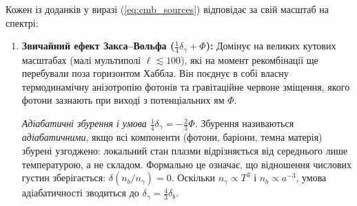 \documentclass[12pt, a4paper]{article}
\begin{document}
Кожен із доданків у виразі (\ref{eq:cmb_sources}) відповідає за свій масштаб на спектрі:
\begin{enumerate}
  \item \textbf{Звичайний ефект Закса--Вольфа ($\frac{1}{4}\delta_\gamma + \Phi$):}
        Домінує на великих кутових масштабах (малі мультиполі $\ell \lesssim 100$),
        які на момент рекомбінації ще перебували поза горизонтом Хаббла.
        Він поєднує в собі власну термодинамічну анізотропію фотонів та
        гравітаційне червоне зміщення, якого фотони зазнають при виході
        з потенціальних ям $\Phi$.

        \textit{Адіабатичні збурення і умова $\frac{1}{4}\delta_\gamma = -\frac{2}{3}\Phi$.}
        Збурення називаються \emph{адіабатичними}, якщо всі компоненти
        (фотони, баріони, темна матерія) збурені узгоджено: локальний
        стан плазми відрізняється від середнього лише температурою, а
        не складом. Формально це означає, що відношення числових густин
        зберігається: $\delta(n_b/n_\gamma) = 0$. Оскільки
        $n_\gamma \propto T^3$ і $n_b \propto a^{-3}$, умова адіабатичності
        зводиться до $\delta_\gamma = \frac{4}{3}\delta_b$.


\end{enumerate}
\end{document}
